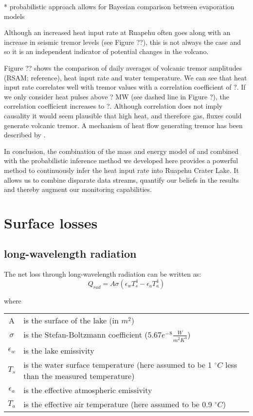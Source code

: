 \documentclass{bmc_template/bmcart}
\begin{document}
* probabilistic approach allows for Bayesian comparison between evaporation models




Although an increased heat input rate at Ruapehu
often goes along with an increase in seismic tremor levels (see Figure ??), this is
not always the case and so it is an independent indicator of potential changes in
the volcano.


Figure ?? shows the comparison of daily averages of volcanic tremor amplitudes
(RSAM; reference), heat input rate and water temperature. We can see that heat
input rate correlates well with tremor values with a correlation coefficient of
?. If we only consider heat pulses above ? MW (see dashed line in Figure ?), the
correlation coefficient increases to ?. Although correlation does not imply
causality it would seem plausible that high heat, and therefore gas, fluxes
could generate volcanic tremor. A mechanism of heat flow generating tremor
has been described by \citet{Iwamura2005}.

In conclusion, the combination of the mass and energy model of \citet{Hurst2015}
and \citet{Stevenson1992} combined with the probabilistic inference method we
developed here provides a powerful method to continuously infer the heat input
rate into Ruapehu Crater Lake. It allows us to combine disparate data streams,
quantify our beliefs in the results and thereby augment our monitoring
capabilities.

\appendix
\section{Surface losses}\label{A}
\subsection{long-wavelength radiation}
The net loss through long-wavelength radiation can be written as:
\begin{equation}
    Q_{rad} = A\sigma(\epsilon_w T_s^4 - \epsilon_a T_a^4)
\end{equation}

where

\begin{tabular}{cp{8cm}}
    A & is the surface of the lake (in $m^2$) \\
    $\sigma$ & is the Stefan-Boltzmann coefficient ($5.67e^{-8} \frac{W}{m^2 K^4}$) \\
    $\epsilon_w$ & is the lake emissivity \\
    $T_s$ & is the water surface temperature (here assumed to be 1 $^{\circ}C$ less than the
    measured temperature) \\
    $\epsilon_a$ & is the effective atmospheric emissivity \\
    $T_a$ & is the effective air temperature (here assumed to be 0.9 $^{\circ}C$) \\ 
\end{tabular}
\end{document}
